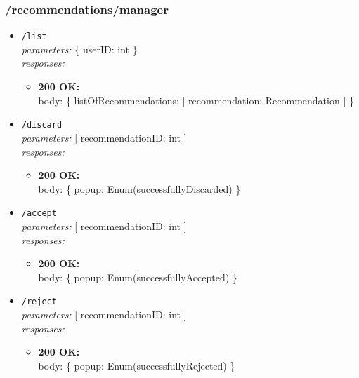 \subsubsection*{/recommendations/manager}
\begin{itemize}
    \item \texttt{/list} \\
        \textit{parameters:} \{ userID: int \} \\
        \textit{responses:}
        \begin{itemize}
            \item \textbf{200 OK:} \\
            body: \{ listOfRecommendations: [ recommendation: Recommendation ] \}
        \end{itemize}
    \item \texttt{/discard} \\
        \textit{parameters:} [ recommendationID: int ] \\
        \textit{responses:}
        \begin{itemize}
            \item \textbf{200 OK:} \\
            body: \{ popup: Enum(successfullyDiscarded) \}
        \end{itemize}
    \item \texttt{/accept} \\
        \textit{parameters:} [ recommendationID: int ] \\
        \textit{responses:}
        \begin{itemize}
            \item \textbf{200 OK:} \\
            body: \{ popup: Enum(successfullyAccepted) \}
        \end{itemize}
    \item \texttt{/reject} \\
        \textit{parameters:} [ recommendationID: int ] \\
        \textit{responses:}
        \begin{itemize}
            \item \textbf{200 OK:} \\
            body: \{ popup: Enum(successfullyRejected) \}
        \end{itemize}
\end{itemize}

